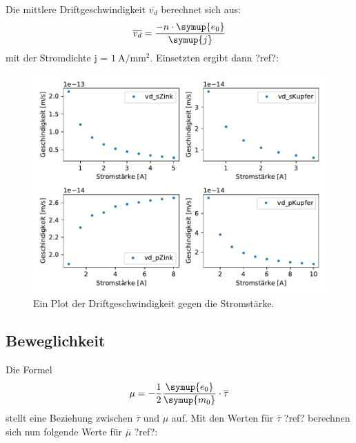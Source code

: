     Die mittlere Driftgeschwindigkeit $\overline{v_d}$ berechnet sich aus:
    \begin{equation}
        \overline{v_d} = \frac{-n \cdot \symup{e_0}}{\symup{j}}
    \end{equation}
    mit der Stromdichte j = $\SI{1}{\ampere\per\milli\meter\squared}$.
    \noindent
    Einsetzten ergibt dann ?ref?:
    \begin{figure}[H]
        \centering
        \includegraphics[width=1.1\textwidth]{build/Driftgeschwindigkeit.pdf}
        \caption{Ein Plot der Driftgeschwindigkeit gegen die Stromstärke.}
        \label{img:vd}
    \end{figure}


    \subsection{Beweglichkeit}


    Die Formel
    \begin{equation}
        \mu= -\frac{1}{2}\frac{\symup{e_0}}{\symup{m_0}}\cdot   \overline{\tau}
    \end{equation}
    stellt eine Beziehung zwischen $\overline{\tau}$ und $\mu$ auf. Mit den Werten für $\overline{\tau}$ ?ref? berechnen sich nun folgende Werte 
    für $\overline{\mu}$ ?ref?:

